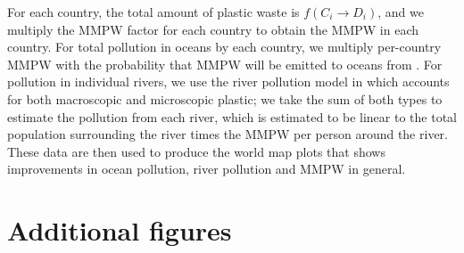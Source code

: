 \documentclass[dvipsnames]{article}
\begin{document}
For each country, the total amount of plastic waste is $f(C_i \to D_i)$, and we multiply the MMPW factor for each country to obtain the MMPW in each country. For total pollution in oceans by each country, we multiply per-country MMPW with the probability that MMPW will be emitted to oceans from \cite{meijer2021more}. For pollution in individual rivers, we use the river pollution model in \cite{peng2021plastic,schmidt2017export} which accounts for both macroscopic and microscopic plastic; we take the sum of both types to estimate the pollution from each river, which is estimated to be linear to the total population surrounding the river times the MMPW per person around the river. These data are then used to produce the world map plots that shows improvements in ocean pollution, river pollution and MMPW in general.



\section{Additional figures}\label{app:eu}
\renewcommand{\thefigure}{B\arabic{figure}}
\setcounter{figure}{0}
\end{document}
